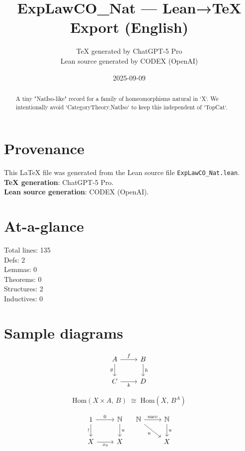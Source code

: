 \documentclass[12pt]{article}
\title{ExpLawCO\_Nat — Lean→TeX Export (English)}
\author{TeX generated by ChatGPT-5 Pro\\Lean source generated by CODEX (OpenAI)}
\date{2025-09-09}
\begin{document}
\maketitle

\begin{abstract}
A tiny "NatIso-like" record for a family of homeomorphisms natural in `X`.
We intentionally avoid `CategoryTheory.NatIso` to keep this independent of `TopCat`.
\end{abstract}

\section*{Provenance}
This \LaTeX{} file was generated from the Lean source file \texttt{ExpLawCO\_Nat.lean}.\\
\textbf{TeX generation}: ChatGPT-5 Pro.\\
\textbf{Lean source generation}: CODEX (OpenAI).

\section*{At-a-glance}
Total lines: 135\\
Defs: 2\\
Lemmas: 0\\
Theorems: 0\\
Structures: 2\\
Inductives: 0

\section*{Sample diagrams}

\[
\begin{tikzcd}
A \arrow[r, "f"] \arrow[d, "g"'] & B \arrow[d, "h"] \\
C \arrow[r, "k"'] & D
\end{tikzcd}
\]



\[
\mathrm{Hom}(X\times A,\,B) \;\cong\; \mathrm{Hom}(X,\,B^A)
\]



\[
\begin{tikzcd}
1 \arrow[r, "0"] \arrow[d, "!"'] & \mathbb{N} \arrow[d, "u"] \\
X \arrow[r, "x_0"'] & X
\end{tikzcd}
\quad
\begin{tikzcd}
\mathbb{N} \arrow[r, "\mathrm{succ}"] \arrow[dr, swap, "u"] & \mathbb{N} \arrow[d, "u"] \\
& X
\end{tikzcd}
\]
\end{document}
